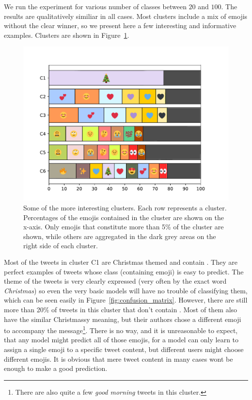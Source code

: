 \documentclass[10pt, a4paper]{article}
\begin{document}
We run the experiment for various number of classes between $20$ and $100$.
The results are qualitatively similiar in all cases. Most clusters include a 
mix of emojis without the clear winner, so we present here a few interesting and
informative examples. Clusters are shown in Figure~\ref{fig:clusters}.

\begin{figure}
\begin{center}
\includegraphics[width=\columnwidth]{img/clusters.pdf}
\caption{Some of the more interesting clusters. Each row represents a cluster. 
Percentages of the emojis contained in the cluster are shown on the x-axis. Only
emojis that constitute more than 5\% of the cluster are shown, while others are 
aggregated in the dark grey areas on the right side of each cluster.}
\label{fig:clusters}
\end{center}
\end{figure}

Most of the tweets in cluster C1 are Christmas themed and contain .
They are perfect examples of tweets whose class (containing emoji) is easy to 
predict. The theme of the tweets is very clearly expressed (very often by the 
exact word \emph{Christmas}) so even the very basic models will have no trouble 
of classifying them, which can be seen easily in 
Figure~\ref{fig:confusion_matrix}. However, there are still more than 20\% of 
tweets in this cluster that don't contain . Most of them also have 
the similar Christmassy meaning, but their authors chose a different emoji to 
accompany the message\footnote{There are also quite a few \emph{good morning} 
tweets in this cluster.}. There is no way, and it is unreasonable to expect, 
that any model might predict all of those emojis, for a model can only learn to 
assign a single emoji to a specific tweet content, but different users might 
choose different emojis. It is obvious that mere tweet content in many cases 
wont be enough to make a good prediction.
\end{document}
